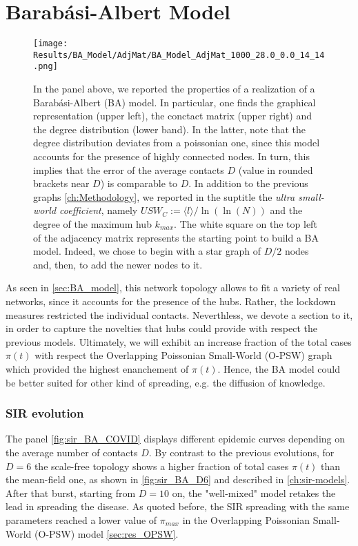 \documentclass[a4paper,10pt,twoside]{book} %
\theoremstyle{definition}
\begin{document}
\section{Barabási-Albert Model}
\label{sec:res_BA}
\begin{figure}[t]
	\centering
	\texttt{[image: Results/BA\_Model/AdjMat/BA\_Model\_AdjMat\_1000\_28.0\_0.0\_14\_14.png]}
	\caption{In the panel above, we reported the properties of a realization of a Barabási-Albert (BA) model.
	In particular, one finds the graphical representation (upper left), the conctact matrix (upper right) and the degree distribution (lower band). In the latter, note that the degree distribution deviates from a poissonian one, since this model accounts for the presence of highly connected nodes. In turn, this implies that the error of the average contacts $ D$ (value in rounded brackets near $ D$) is comparable to $ D$. In addition to the previous graphs \autoref{ch:Methodology}, we reported in the suptitle the \textit{ultra small-world coefficient}, namely $ USW_C := \langle l \rangle / \ln(\ln(N))$ and the degree of the maximum hub $ k_{max}$.  
	The white square on the top left of the adjacency matrix represents the starting point to build a BA model. Indeed, we chose to begin with a star graph of $D/2$ nodes and, then, to add the newer nodes to it.}
	\label{fig:BA_model_Network}
\end{figure}
As seen in \autoref{sec:BA_model}, this network topology allows to fit a variety of real networks, since it accounts for the presence of the hubs. Rather, the lockdown measures restricted the individual contacts. Neverthless, we devote a section to it, in order to capture the novelties that hubs could provide with respect the previous models.
Ultimately, we will exhibit an increase fraction of the total cases $ \pi(t)$  with respect the Overlapping Poissonian Small-World (O-PSW) graph which provided the highest enanchement of $ \pi(t)$. Hence, the BA model could be better suited for other kind of spreading, e.g. the diffusion of knowledge.

\subsubsection*{SIR evolution}
The panel \autoref{fig:sir_BA_COVID} displays different epidemic curves depending on the average number of contacts $D$. By contrast to the previous evolutions, for $D = 6$ the scale-free topology shows a higher fraction of total cases $\pi(t)$ than the mean-field one, as shown in \autoref{fig:sir_BA_D6} and described in \autoref{ch:sir-models}.
After that burst, starting from $D = 10$ on, the "well-mixed" model retakes the lead in spreading the disease. As quoted before, the SIR spreading with the same parameters reached a lower value of $ \pi_{max} $ in the Overlapping Poissonian Small-World (O-PSW) model \autoref{sec:res_OPSW}.  
\end{document}
